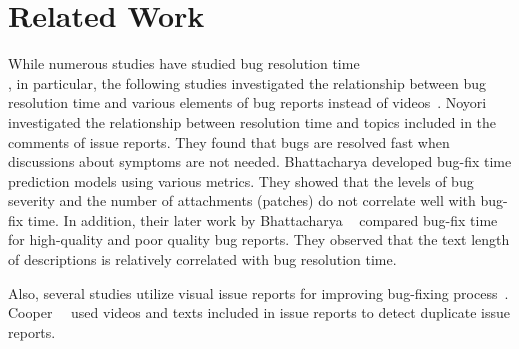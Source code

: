 \section{Related Work}
\label{sec:relate}
While numerous studies have studied bug resolution time~\citep{DBLP:conf/msr/ChenNSH14}\citep{DBLP:journals/jss/GarciaSN18}\citep{DBLP:conf/sigsoft/JeongKZ09}\\
\citep{DBLP:conf/icsm/KashiwaYKO14}\citep{DBLP:conf/msr/ZamanAH11}, 
in particular, the following studies investigated the relationship between bug resolution time and various elements of bug reports instead of videos~\citep{DBLP:conf/msr/BhattacharyaN11}\citep{DBLP:conf/csmr/BhattacharyaUNK13}\citep{DBLP:journals/ieicetd/NoyoriWFKONT21}. 
Noyori~\et~\citep{DBLP:journals/ieicetd/NoyoriWFKONT21} investigated the relationship between resolution time and topics included in the comments of issue reports. 
They found that bugs are resolved fast when discussions about symptoms are not needed.  Bhattacharya \et \citep{DBLP:conf/msr/BhattacharyaN11} developed bug-fix
time prediction models using various metrics. They showed that the levels of bug severity and the number of attachments (patches) do not correlate well with bug-fix time. In addition, their later work by Bhattacharya \et~\citep{DBLP:conf/csmr/BhattacharyaUNK13} compared bug-fix time for high-quality and poor quality bug reports. They observed that the text length of descriptions is relatively correlated with bug resolution time. 

Also, several studies utilize visual issue reports for improving bug-fixing process~\citep{DBLP:conf/icse/CooperBCMP21}\citep{TODO}. Cooper~\et~\citep{DBLP:conf/icse/CooperBCMP21} used videos and texts included in issue reports to detect duplicate issue reports. 